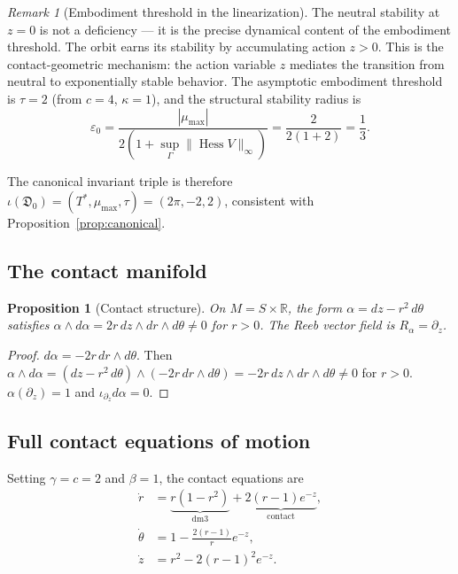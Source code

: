 \documentclass[reqno]{amsart}
\numberwithin{equation}{section}
\theoremstyle{plain}
\newtheorem{proposition}[theorem]{Proposition}
\theoremstyle{definition}
\theoremstyle{remark}
\newtheorem{remark}[theorem]{Remark}
\newcommand{\R}{\mathbb{R}}
\newcommand{\dm}{\mathfrak{D}}
\newcommand{\Orb}{\Gamma}
\DeclareMathOperator{\Hess}{Hess}
\begin{document}
\begin{remark}[Embodiment threshold in the linearization]
The neutral stability at $z=0$ is not a deficiency --- it is
the precise dynamical content of the embodiment threshold.
The orbit earns its stability by accumulating action $z>0$.
This is the contact-geometric mechanism: the action variable $z$
mediates the transition from neutral to exponentially stable
behavior. The asymptotic embodiment threshold is
$\tau=2$ (from $c=4$, $\kappa=1$), and the structural stability
radius is
\[
  \varepsilon_0
  = \frac{|\mu_{\max}|}{2(1+\sup_\Orb\|\Hess V\|_\infty)}
  = \frac{2}{2(1+2)}
  = \frac{1}{3}.
\]
\end{remark}

The canonical invariant triple is therefore
$\iota(\dm_0)=(T^*,\mu_{\max},\tau)=(2\pi,-2,2)$,
consistent with Proposition~\ref{prop:canonical}.

\subsection{The contact manifold}

\begin{proposition}[Contact structure]\label{prop:contactstruct}
On $M=S\times\R$, the form $\alpha=dz-r^2\,d\theta$ satisfies
$\alpha\wedge d\alpha=2r\,dz\wedge dr\wedge d\theta\ne 0$
for $r>0$. The Reeb vector field is $R_\alpha=\partial_z$.
\end{proposition}
\begin{proof}
$d\alpha=-2r\,dr\wedge d\theta$. Then
$\alpha\wedge d\alpha=(dz-r^2\,d\theta)\wedge(-2r\,dr\wedge d\theta)
=-2r\,dz\wedge dr\wedge d\theta\ne 0$ for $r>0$.
$\alpha(\partial_z)=1$ and $\iota_{\partial_z}d\alpha=0$.
\end{proof}

\subsection{Full contact equations of motion}

Setting $\gamma=c=2$ and $\beta=1$, the contact equations are
\begin{align}
  \dot r &= \underbrace{r(1-r^2)}_{\text{dm3}}
           + \underbrace{2(r-1)e^{-z}}_{\text{contact}},
           \label{eq:r-full}\\
  \dot\theta &= 1 - \frac{2(r-1)}{r}e^{-z},\label{eq:theta-full}\\
  \dot z &= r^2 - 2(r-1)^2 e^{-z}.\label{eq:z-full}
\end{align}
\end{document}
